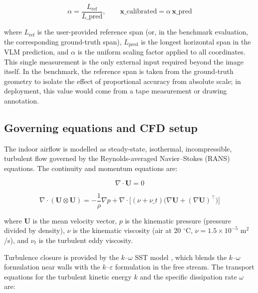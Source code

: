 \documentclass[preprint,12pt,number]{elsarticle}
\begin{document}
\begin{equation}
\alpha = \frac{L_\text{ref}}{L\_\text{pred}}, \qquad \mathbf{x}\_\text{calibrated} = \alpha \, \mathbf{x}\_\text{pred}
\label{eq:scale-calibration}
\end{equation}

where $L_\text{ref}$ is the user-provided reference span (or, in the benchmark evaluation, the corresponding ground-truth span), $L_\text{pred}$ is the longest horizontal span in the VLM prediction, and $\alpha$ is the uniform scaling factor applied to all coordinates. This single measurement is the only external input required beyond the image itself. In the benchmark, the reference span is taken from the ground-truth geometry to isolate the effect of proportional accuracy from absolute scale; in deployment, this value would come from a tape measurement or drawing annotation.

\subsection{Governing equations and CFD setup}
\label{sec:governing-equations-and-cfd-setup}


The indoor airflow is modelled as steady-state, isothermal, incompressible, turbulent flow governed by the Reynolds-averaged Navier--Stokes (RANS) equations. The continuity and momentum equations are:

\begin{equation}
\nabla \cdot \mathbf{U} = 0
\label{eq:continuity}
\end{equation}

\begin{equation}
\nabla \cdot (\mathbf{U} \otimes \mathbf{U}) = -\frac{1}{\rho}\nabla p + \nabla \cdot \bigl[(\nu + \nu\_t)\bigl(\nabla \mathbf{U} + (\nabla \mathbf{U})^\top\bigr)\bigr]
\label{eq:momentum}
\end{equation}

where $\mathbf{U}$ is the mean velocity vector, $p$ is the kinematic pressure (pressure divided by density), $\nu$ is the kinematic viscosity (air at 20 $^\circ$C, $\nu = 1.5 \times 10^{-5}$ m$^2$/s), and $\nu_t$ is the turbulent eddy viscosity.

Turbulence closure is provided by the $k$--$\omega$ SST model \cite{menter1994TwoequationEddyviscosity}, which blends the $k$--$\omega$ formulation near walls with the $k$--$\varepsilon$ formulation in the free stream. The transport equations for the turbulent kinetic energy $k$ and the specific dissipation rate $\omega$ are:
\end{document}
